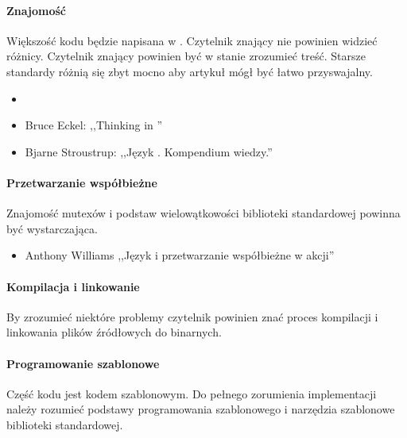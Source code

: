 \paragraph{Znajomość }
Większość kodu będzie napisana w . Czytelnik znający  nie powinien widzieć różnicy. Czytelnik znający  powinien być w stanie zrozumieć treść. Starsze standardy różnią się zbyt mocno aby artykuł mógł być łatwo przyswajalny.
\begin{itemize}
\item {}
\item Bruce Eckel: ,,Thinking in \Cpp''
\item Bjarne Stroustrup: ,,Język \Cpp. Kompendium wiedzy.''
\end{itemize}

\paragraph{Przetwarzanie współbieżne}
Znajomość mutexów i podstaw wielowątkowości biblioteki standardowej \Cpp{} powinna być wystarczająca.
\begin{itemize}
\item Anthony Williams ,,Język \Cpp{} i przetwarzanie współbieżne w akcji''
\end{itemize}

\paragraph{Kompilacja i linkowanie}
By zrozumieć niektóre problemy czytelnik powinien znać proces kompilacji i linkowania plików źródłowych do binarnych.

\paragraph{Programowanie szablonowe}
Część kodu jest kodem szablonowym. Do pełnego zorumienia implementacji należy rozumieć podstawy programowania szablonowego i narzędzia szablonowe biblioteki standardowej.
